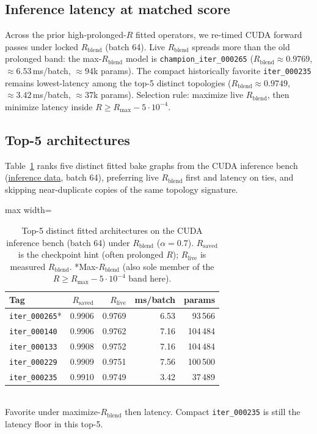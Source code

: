 \subsection{Inference latency at matched score}
\label{sec:inference-latency}
Across the prior high-prolonged-$R$ fitted operators, we re-timed CUDA forward passes under locked $R_{\mathrm{blend}}$ (batch 64).
Live $R_{\mathrm{blend}}$ spreads more than the old prolonged band: the max-$R_{\mathrm{blend}}$ model is
\texttt{champion\_iter\_000265} ($R_{\mathrm{blend}}{\approx}0.9769$, $\approx 6.53$\,ms/batch, $\approx 94$k params).
The compact historically favorite \texttt{iter\_000235} remains lowest-latency among the top-5 distinct topologies
($R_{\mathrm{blend}}{\approx}0.9749$, $\approx 3.42$\,ms/batch, $\approx 37$k params).
Selection rule: maximize live $R_{\mathrm{blend}}$, then minimize latency inside $R\ge R_{\max}-5\cdot10^{-4}$.

\subsection{Top-5 architectures}
\label{sec:top5-arch}
Table~\ref{tab:top5} ranks five distinct fitted bake graphs from the CUDA inference bench
(\href{https://github.com/reeldemo/denoise-opt-meta/blob/master/paper/Unsupervised_Wrap-Discontinuity_Repair_in_Wavetable_Synthesis_via_Hybrid_GA-PPO_Meta-Search_v12/figures/inference_bench.json}{inference data}, batch 64), preferring live $R_{\mathrm{blend}}$ first and latency on ties,
and skipping near-duplicate copies of the same topology signature.

\begin{table}[htbp]
  \centering
  \caption{Top-5 distinct fitted architectures on the CUDA inference bench (batch 64) under $R_{\mathrm{blend}}$ ($\alpha{=}0.7$).
  $R_{\mathrm{saved}}$ is the checkpoint hint (often prolonged $R$); $R_{\mathrm{live}}$ is measured $R_{\mathrm{blend}}$.
  *Max-$R_{\mathrm{blend}}$ (also sole member of the $R\ge R_{\max}-5\cdot10^{-4}$ band here).}
  \label{tab:top5}
  \setlength{\tabcolsep}{3pt}
  \begin{adjustbox}{max width=\columnwidth}
\begin{tabular}{@{}lrrrr@{}}
    \toprule
    Tag & $R_{\mathrm{saved}}$ & $R_{\mathrm{live}}$ & ms/batch & params \\
    \midrule
    \texttt{iter\_000265}* & 0.9906 & 0.9769 & 6.53 & 93\,566 \\
    \texttt{iter\_000140} & 0.9906 & 0.9762 & 7.16 & 104\,484 \\
    \texttt{iter\_000133} & 0.9908 & 0.9752 & 7.16 & 104\,484 \\
    \texttt{iter\_000229} & 0.9909 & 0.9751 & 7.56 & 100\,500 \\
    \texttt{iter\_000235} & 0.9910 & 0.9749 & 3.42 & 37\,489 \\
    \bottomrule
  \end{tabular}
\end{adjustbox}\\[0.4em]
  {\footnotesize *Favorite under maximize-$R_{\mathrm{blend}}$ then latency. Compact \texttt{iter\_000235} is still the latency floor in this top-5.}
\end{table}

